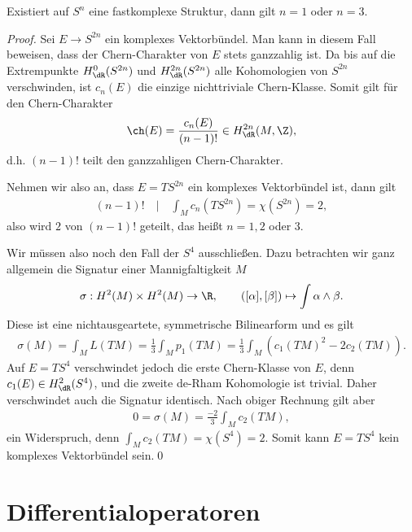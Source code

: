\documentclass[%
	paper=a5,%
	fleqn,%
	DIV=18,%
	BCOR=0mm,
	fontsize=11pt,
	titlepage=false,%
	bibliography=totoc,
	DIV=18,%
	twoside=true,
	pdftitle=Riemannsche Geometrie,
	pdfauthor=Uwe Semmelmann,
	numbers=noendperiod]%
	{scrbook}
\begin{document}
\begin{prop}
Existiert auf $S^n$ eine fastkomplexe Struktur, dann gilt $n=1$ oder $n=3$.\fish
\end{prop}
\begin{proof}
Sei $E\to S^{2n}$ ein komplexes Vektorbündel. Man kann in diesem Fall beweisen, dass der Chern-Charakter von $E$ stets ganzzahlig ist. Da bis auf die Extrempunkte $H_{\dR}^0(S^{2n})$ und $H_{\dR}^{2n}(S^{2n})$ alle Kohomologien von $S^{2n}$ verschwinden, ist $c_{n}(E)$ die einzige nichttriviale Chern-Klasse. Somit gilt für den Chern-Charakter
\begin{align*}
\ch(E) = \frac{c_{n}(E)}{(n-1)!}\in H^{2n}_{\dR}(M,\Z),
\end{align*}
d.h. $(n-1)!$ teilt den ganzzahligen Chern-Charakter.

Nehmen wir also an, dass $E=TS^{2n}$ ein komplexes Vektorbündel ist, dann gilt
\begin{align*}
(n-1)! \quad \bigg|\quad \int_{M} c_n(TS^{2n}) = \chi(S^{2n}) = 2,
\end{align*}
also wird $2$ von $(n-1)!$  geteilt, das heißt $n=1,2$ oder $3$.

Wir müssen also noch den Fall der $S^4$ ausschließen. Dazu betrachten wir ganz allgemein
die Signatur einer Mannigfaltigkeit $M$
\begin{align*}
\sigma: H^2(M)\times H^2(M)\to \R,\qquad ([\alpha],[\beta]) \mapsto \int \alpha\wedge \beta.
\end{align*}
Diese ist eine nichtausgeartete, symmetrische Bilinearform und es gilt
\begin{align*}
\sigma(M) = \int_{M} L(TM) = \frac{1}{3}\int_{M} p_{1}(TM) = 
\frac{1}{3}\int_{M} (c_{1}(TM)^2 - 2c_{2}(TM)). 
\end{align*}
Auf $E=TS^4$ verschwindet jedoch die erste Chern-Klasse von $E$, denn $c_{1}(E) \in H_{\dR}^2(S^4)$, und die zweite de-Rham Kohomologie ist trivial. Daher verschwindet auch die Signatur identisch. Nach obiger Rechnung gilt aber
\begin{align*}
0 = \sigma(M) =  \frac{-2}{3}\int_{M} c_{2}(TM),
\end{align*}
ein Widerspruch, denn $\int_Mc_{2}(TM)= \chi(S^4)=2$. Somit kann $E = TS^4$ kein komplexes Vektorbündel sein.\qed
\end{proof}


\chapter{Differentialoperatoren}
\end{document}
